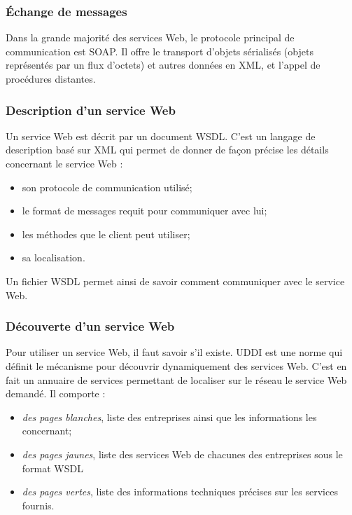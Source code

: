 \subsubsection{\'Echange de messages}

Dans la grande majorit\'e des services Web, le protocole principal de communication est SOAP.
Il offre le transport d'objets s\'erialis\'es (objets repr\'esent\'es par un flux d'octets) et autres donn\'ees en XML, et l'appel de proc\'edures distantes.

\subsubsection{Description d'un service Web}

Un service Web est d\'ecrit par un document WSDL.
C'est un langage de description bas\'e sur XML qui permet de donner de fa\c{c}on pr\'ecise les d\'etails concernant le service Web :

\begin{itemize}
	\item son protocole de communication utilis\'e;
	\item le format de messages requit pour communiquer avec lui;
	\item les m\'ethodes que le client peut utiliser;
	\item sa localisation.

\end{itemize}

\vspace{0.20cm}

\noindent Un fichier WSDL permet ainsi de savoir comment communiquer avec le service Web.

\subsubsection{D\'ecouverte d'un service Web}

Pour utiliser un service Web, il faut savoir s'il existe.
UDDI est une norme qui d\'efinit le m\'ecanisme pour d\'ecouvrir dynamiquement des services Web.
C'est en fait un annuaire de services permettant de localiser sur le r\'eseau le service Web demand\'e.
\noindent Il comporte :

\begin{itemize}
	\item \textit{des pages blanches}, liste des entreprises ainsi que les informations les concernant;
	\item \textit{des pages jaunes}, liste des services Web de chacunes des entreprises sous le format WSDL
	\item \textit{des pages vertes}, liste des informations techniques pr\'ecises sur les services fournis.

\end{itemize}



